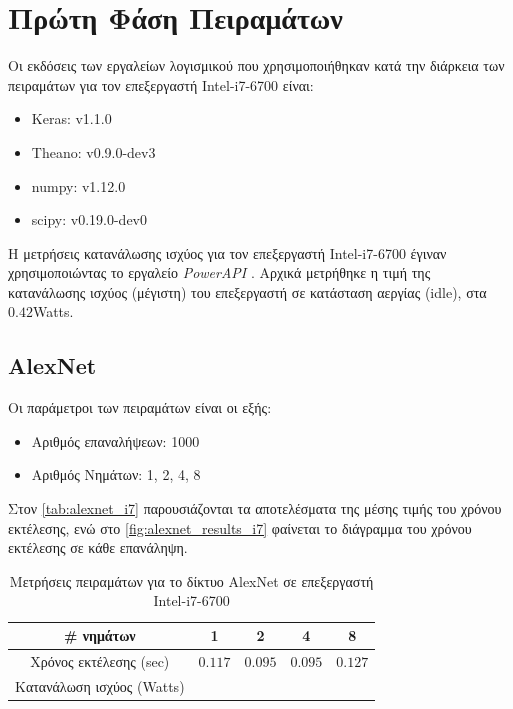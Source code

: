 \section{Πρώτη Φάση Πειραμάτων}
\label{sec:experiments_phase1}

Οι εκδόσεις των εργαλείων λογισμικού που χρησιμοποιήθηκαν
κατά την διάρκεια των πειραμάτων για τον επεξεργαστή Intel-i7-6700 είναι:
\begin{itemize}
  \item{Keras: v1.1.0}
  \item{Theano: v0.9.0-dev3}
  \item{numpy: v1.12.0}
  \item{scipy: v0.19.0-dev0}
\end{itemize}

Η μετρήσεις κατανάλωσης ισχύος για τον επεξεργαστή Intel-i7-6700 έγιναν
χρησιμοποιώντας το εργαλείο \emph{PowerAPI} \cite{grant2016standardizing}.
Αρχικά μετρήθηκε η τιμή της κατανάλωσης ισχύος (μέγιστη) του επεξεργαστή σε
κατάσταση αεργίας (idle), στα $0.42$Watts.

\subsection{AlexNet}

Οι παράμετροι των πειραμάτων είναι οι εξής:
\begin{itemize}
  \item{Αριθμός επαναλήψεων: 1000}
  \item{Αριθμός Νημάτων: 1, 2, 4, 8}
\end{itemize}

Στον \autoref{tab:alexnet_i7} παρουσιάζονται τα αποτελέσματα της μέσης τιμής
του χρόνου εκτέλεσης, ενώ στο \autoref{fig:alexnet_results_i7} φαίνεται
το διάγραμμα του χρόνου εκτέλεσης σε κάθε επανάληψη.

\begin{table}[H]
  \begin{center}
    \caption{Μετρήσεις πειραμάτων για το δίκτυο AlexNet σε επεξεργαστή Intel-i7-6700}
    \label{tab:alexnet_i7}
    \begin{tabular}{ | c | c | c | c | c | }
      \hline
      \rowcolor{Gray}
      \# νημάτων & 1 & 2 & 4 & 8 \\
      \hline
      Χρόνος εκτέλεσης (sec) & $0.117$ & $0.095$ & $0.095$ & $0.127$ \\
      Κατανάλωση ισχύος (Watts) & $ $ & $ $ & $ $ & $ $ \\
      \hline
    \end{tabular}
  \end{center}
\end{table}

